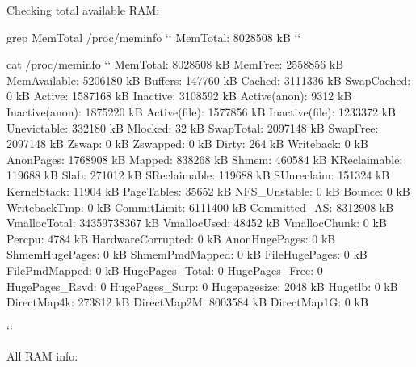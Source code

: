 \documentclass[]{article}
\begin{document}
Checking total available RAM:
\begin{ubuntu}
grep MemTotal /proc/meminfo `\StartConsole`
MemTotal:        8028508 kB
``
\end{ubuntu}


\begin{ubuntu}
cat /proc/meminfo `\StartConsole`
MemTotal:        8028508 kB
MemFree:         2558856 kB
MemAvailable:    5206180 kB
Buffers:          147760 kB
Cached:          3111336 kB
SwapCached:            0 kB
Active:          1587168 kB
Inactive:        3108592 kB
Active(anon):       9312 kB
Inactive(anon):  1875220 kB
Active(file):    1577856 kB
Inactive(file):  1233372 kB
Unevictable:      332180 kB
Mlocked:              32 kB
SwapTotal:       2097148 kB
SwapFree:        2097148 kB
Zswap:                 0 kB
Zswapped:              0 kB
Dirty:               264 kB
Writeback:             0 kB
AnonPages:       1768908 kB
Mapped:           838268 kB
Shmem:            460584 kB
KReclaimable:     119688 kB
Slab:             271012 kB
SReclaimable:     119688 kB
SUnreclaim:       151324 kB
KernelStack:       11904 kB
PageTables:        35652 kB
NFS_Unstable:          0 kB
Bounce:                0 kB
WritebackTmp:          0 kB
CommitLimit:     6111400 kB
Committed_AS:    8312908 kB
VmallocTotal:   34359738367 kB
VmallocUsed:       48452 kB
VmallocChunk:          0 kB
Percpu:             4784 kB
HardwareCorrupted:     0 kB
AnonHugePages:         0 kB
ShmemHugePages:        0 kB
ShmemPmdMapped:        0 kB
FileHugePages:         0 kB
FilePmdMapped:         0 kB
HugePages_Total:       0
HugePages_Free:        0
HugePages_Rsvd:        0
HugePages_Surp:        0
Hugepagesize:       2048 kB
Hugetlb:               0 kB
DirectMap4k:      273812 kB
DirectMap2M:     8003584 kB
DirectMap1G:           0 kB

``
\end{ubuntu}

\pagebreak

All RAM info:
\end{document}
